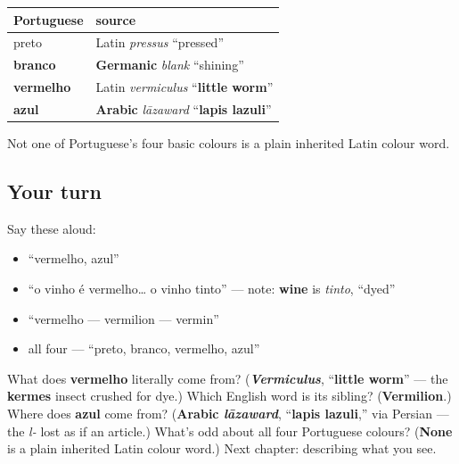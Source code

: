 \begin{grammarlens}[title={What you've built: The chapter in one table}]
\noindent
\begin{tabularx}{\linewidth}{@{}>{\raggedright\arraybackslash}X>{\raggedright\arraybackslash}X@{}}
\toprule
\textbf{Portuguese} & \textbf{source} \\
\midrule
preto & Latin \emph{pressus} \textquotedblleft{}pressed\textquotedblright{} \\
\textbf{branco} & \textbf{Germanic} \emph{blank} \textquotedblleft{}shining\textquotedblright{} \\
\textbf{vermelho} & Latin \emph{vermiculus} \textquotedblleft{}\textbf{little worm}\textquotedblright{} \\
\textbf{azul} & \textbf{Arabic} \emph{lāzaward} \textquotedblleft{}\textbf{lapis lazuli}\textquotedblright{} \\
\bottomrule
\end{tabularx}

Not one of Portuguese's four basic colours is a plain inherited Latin colour word.
\end{grammarlens}

\subsection*{Your turn}
Say these aloud:

\begin{itemize}
\raggedright
  \item \textquotedblleft{}vermelho, azul\textquotedblright{}
  \item \textquotedblleft{}o vinho é vermelho… o vinho tinto\textquotedblright{} — note: \textbf{wine} is \emph{tinto}, \textquotedblleft{}dyed\textquotedblright{}
  \item \textquotedblleft{}vermelho — vermilion — vermin\textquotedblright{}
  \item all four — \textquotedblleft{}preto, branco, vermelho, azul\textquotedblright{}
\end{itemize}

\begin{tcolorbox}[breakable,colback=teal!4,colframe=teal!35!black,title={Before you move on}]
What does \textbf{vermelho} literally come from? (\emph{\textbf{Vermiculus}}, \textquotedblleft{}\textbf{little worm}\textquotedblright{} — the \textbf{kermes} insect crushed for dye.) Which English word is its sibling? (\textbf{Vermilion}.) Where does \textbf{azul} come from? (\textbf{Arabic \emph{lāzaward}}, \textquotedblleft{}\textbf{lapis lazuli},\textquotedblright{} via Persian — the \emph{l-} lost as if an article.) What's odd about all four Portuguese colours? (\textbf{None} is a plain inherited Latin colour word.) Next chapter: describing what you see.
\end{tcolorbox}
